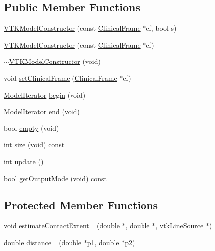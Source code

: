 \subsection*{Public Member Functions}
\begin{DoxyCompactItemize}
\item 
\hyperlink{classVTKModelConstructor_ad454bb3edb39bb81f7e8ea9580d31f05}{V\-T\-K\-Model\-Constructor} (const \hyperlink{classClinicalFrame}{Clinical\-Frame} $\ast$cf, bool s)
\item 
\hyperlink{classVTKModelConstructor_a6e08f2bba1f5b26d64f74ae64101e211}{V\-T\-K\-Model\-Constructor} (const \hyperlink{classClinicalFrame}{Clinical\-Frame} $\ast$cf)
\item 
\hyperlink{classVTKModelConstructor_accd2e4a9fce297452524424c56645af0}{$\sim$\-V\-T\-K\-Model\-Constructor} (void)
\item 
void \hyperlink{classVTKModelConstructor_a9661f98d603ca128f5bdf22ef78b15f1}{set\-Clinical\-Frame} (\hyperlink{classClinicalFrame}{Clinical\-Frame} $\ast$cf)
\item 
\hyperlink{classVTKModelConstructor_a8ab5ac1866904faee9e4120b07f63701}{Model\-Iterator} \hyperlink{classVTKModelConstructor_abd4236c1af1eb4c52dca9c89aa504555}{begin} (void)
\item 
\hyperlink{classVTKModelConstructor_a8ab5ac1866904faee9e4120b07f63701}{Model\-Iterator} \hyperlink{classVTKModelConstructor_a056e86cab4140ff9975d636de3a33486}{end} (void)
\item 
bool \hyperlink{classVTKModelConstructor_ac6f76a490e608339b6aa148089f535f7}{empty} (void)
\item 
int \hyperlink{classVTKModelConstructor_a5f939d68c9f15d8ec22ddb6a0c0090c7}{size} (void) const 
\item 
int \hyperlink{classVTKModelConstructor_ad6f6baa567097da53cbcaa91cf375531}{update} ()
\item 
bool \hyperlink{classVTKModelConstructor_aaec58670f5bb650109de05d2bbc5f8f1}{get\-Output\-Mode} (void) const 
\end{DoxyCompactItemize}
\subsection*{Protected Member Functions}
\begin{DoxyCompactItemize}
\item 
void \hyperlink{classVTKModelConstructor_a97c3716459da1a19e15a1b91283ccc8e}{estimate\-Contact\-Extent\-\_\-} (double $\ast$, double $\ast$, vtk\-Line\-Source $\ast$)
\item 
double \hyperlink{classVTKModelConstructor_a458e23ce8a24102118938f2ca18c8c2c}{distance\-\_\-} (double $\ast$p1, double $\ast$p2)
\end{DoxyCompactItemize}


